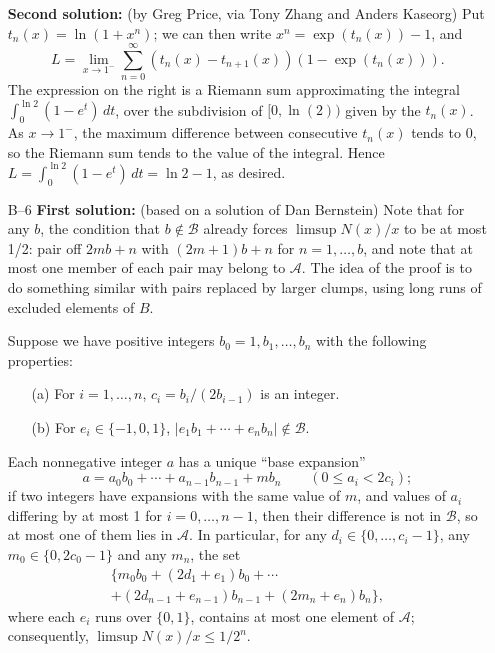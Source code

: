 \documentclass[amssymb,twocolumn,pra,10pt,aps]{revtex4-1}
\begin{document}
\begin{itemize}
\textbf{Second solution:}
(by Greg Price, via Tony Zhang and Anders Kaseorg)
Put $t_n(x) = \ln(1 + x^n)$;
we can then write $x^n = \exp(t_n(x)) - 1$, and
\[
L = \lim_{x \to 1^-} \sum_{n=0}^\infty (t_n(x) - t_{n+1}(x))(1 - \exp(t_n(x))).
\]
The expression on the right is a Riemann sum approximating the
integral $\int_0^{\ln 2} (1-e^t)\,dt$, over the subdivision of $[0,\ln(2))$
given by the $t_n(x)$. As $x \to 1^-$, the maximum difference between
consecutive $t_n(x)$ tends to 0, so the Riemann sum tends to the value
of the integral. Hence $L = \int_0^{\ln 2}(1 - e^t)\,dt = \ln 2 - 1$, as
desired.

\def\calA{\mathcal{A}}
\def\calB{\mathcal{B}}

\item[B--6]
\textbf{First solution:}
(based on a solution of Dan Bernstein)
Note that for any $b$, the condition that $b \notin \calB$ already
forces $\limsup N(x)/x$ to be at most 1/2: pair off $2mb + n$ with
$(2m+1)b+n$ for $n=1,\dots, b$, and note that at most one member of each
pair may belong to $\calA$.
The idea of the proof is to do something
similar with pairs replaced by larger clumps, using long runs of
excluded elements of $B$.

Suppose we have positive integers
$b_0 = 1, b_1, \dots, b_n$ with
the following properties:
\begin{enumerate}
\item[(a)] For $i=1, \dots, n$,
$c_i = b_i/(2b_{i-1})$ is an integer.
\item[(b)] For $e_i \in \{-1,0,1\}$,
$|e_1b_1 + \cdots + e_n b_n| \notin \calB$.
\end{enumerate}
Each nonnegative integer $a$ has a unique ``base expansion''
\[
a = a_0 b_0 + \cdots + a_{n-1} b_{n-1} + m b_n \qquad (0 \leq a_i < 2c_i);
\]
if two integers have expansions with the same value of $m$, and values
of $a_i$ differing by at most 1 for $i=0, \dots, n-1$, then their
difference is not in $\calB$, so at most one of them lies in $\calA$.
In particular,
for any $d_i \in \{0, \dots, c_i - 1\}$, any $m_0 \in \{0, 2c_0 - 1\}$
and any $m_n$, the set
\begin{multline*}
\{m_0 b_0 + (2d_1 +e_1)b_0 + \cdots \\
+ (2d_{n-1} + e_{n-1})b_{n-1} + (2m_n + e_n)b_n\},
\end{multline*}
where each $e_i$ runs over $\{0,1\}$,
contains at most one element of $\calA$; consequently,
$\limsup N(x)/x \leq 1/2^{n}$.


\end{itemize}
\end{document}
